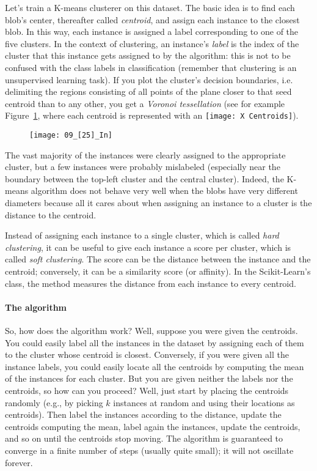 Let's train a K-means clusterer on this dataset. The basic idea is to find each blob's center, thereafter called \emph{centroid}, and assign each instance to the closest blob. In this way, each instance is assigned a label corresponding to one of the five clusters. In the context of clustering, an instance's \emph{label} is the index of the cluster that this instance gets assigned to by the algorithm: this is not to be confused with the class labels in classification (remember that clustering is an unsupervised learning task).
If you plot the cluster's decision boundaries, i.e. delimiting the regions consisting of all points of the plane closer to that seed centroid than to any other, you get a \emph{Voronoi tessellation} (see for example Figure~\ref{09_[25]_In}, where each centroid is represented with an \texttt{[image: X Centroids]}).
\begin{figure}[h!t]
\centering
\texttt{[image: 09\_[25]\_In]}
\caption{}\label{09_[25]_In}
\end{figure}

The vast majority of the instances were clearly assigned to the appropriate cluster, but a few instances were probably mislabeled (especially near the boundary between the top-left cluster and the central cluster). Indeed, the
K-means algorithm does not behave very well when the blobs have very different diameters because all it cares about when assigning an instance to a cluster is the distance to the centroid.

Instead of assigning each instance to a single cluster, which is called \emph{hard clustering}, it can be useful to give each instance a score per cluster, which is called \emph{soft clustering}. The score can be the distance between the instance and the centroid; conversely, it can be a similarity score (or affinity). In the Scikit-Learn's  class, the  method measures the distance from each instance to every centroid.
\paragraph{The algorithm}
So, how does the algorithm work? Well, suppose you were given the centroids. You could easily label all the instances in the dataset by assigning each of them to the cluster whose centroid is closest. Conversely, if you were given all the instance labels, you could easily locate all the centroids by computing the mean of the instances for each cluster. But you are given neither the labels nor the centroids, so how can you proceed? Well, just start by placing the centroids randomly (e.g., by picking $k$ instances at random and using their locations as centroids). Then label the instances according to the distance, update the centroids computing the mean, label again the instances, update the centroids, and so on until the centroids stop moving. The algorithm is guaranteed to converge in a finite number of steps (usually quite small); it will not oscillate forever.

